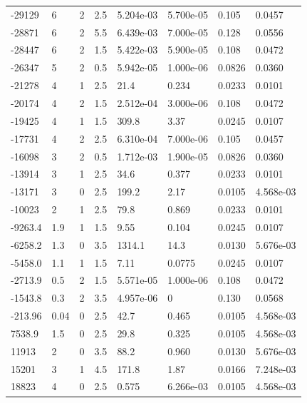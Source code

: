 \documentclass[preview]{standalone}
\begin{document}
{{\begin{tabular}{L{1.2cm}C{1.2cm} C{0.3cm}C{0.5cm} C{1.4cm}C{1.4cm} C{1.4cm}C{1.4cm}}
  -29129  &     6  & 2     & 2.5 &  5.204e-03  & 5.700e-05  & 0.105 &  0.0457   \\ 
  -28871  &     6  & 2     & 5.5 &  6.439e-03  & 7.000e-05  & 0.128 &  0.0556   \\ 
  -28447  &     6  & 2     & 1.5 &  5.422e-03  & 5.900e-05  & 0.108 &  0.0472   \\ 
  -26347  &     5  & 2     & 0.5 &  5.942e-05  & 1.000e-06  & 0.0826 &  0.0360   \\ 
  -21278  &     4  & 1     & 2.5 &  21.4  & 0.234  & 0.0233 &  0.0101   \\ 
  -20174  &     4  & 2     & 1.5 &  2.512e-04  & 3.000e-06  & 0.108 &  0.0472   \\ 
  -19425  &     4  & 1     & 1.5 &  309.8  & 3.37  & 0.0245 &  0.0107   \\ 
  -17731  &     4  & 2     & 2.5 &  6.310e-04  & 7.000e-06  & 0.105 &  0.0457   \\ 
  -16098  &     3  & 2     & 0.5 &  1.712e-03  & 1.900e-05  & 0.0826 &  0.0360   \\ 
  -13914  &     3  & 1     & 2.5 &  34.6  & 0.377  & 0.0233 &  0.0101   \\ 
  -13171  &     3  & 0     & 2.5 &  199.2  & 2.17  & 0.0105 &  4.568e-03   \\ 
  -10023  &     2  & 1     & 2.5 &  79.8  & 0.869  & 0.0233 &  0.0101   \\ 
  -9263.4  &   1.9  & 1     & 1.5 &  9.55  & 0.104  & 0.0245 &  0.0107   \\ 
  -6258.2  &   1.3  & 0     & 3.5 &  1314.1  & 14.3  & 0.0130 &  5.676e-03   \\ 
  -5458.0  &   1.1  & 1     & 1.5 &  7.11  & 0.0775  & 0.0245 &  0.0107   \\ 
  -2713.9  &   0.5  & 2     & 1.5 &  5.571e-05  & 1.000e-06  & 0.108 &  0.0472   \\ 
  -1543.8  &   0.3  & 2     & 3.5 &  4.957e-06  & 0  & 0.130 &  0.0568   \\ 
  -213.96  &  0.04  & 0     & 2.5 &  42.7  & 0.465  & 0.0105 &  4.568e-03   \\ 
  7538.9  &   1.5  & 0     & 2.5 &  29.8  & 0.325  & 0.0105 &  4.568e-03   \\ 
  11913  &     2  & 0     & 3.5 &  88.2  & 0.960  & 0.0130 &  5.676e-03   \\ 
  15201  &     3  & 1     & 4.5 &  171.8  & 1.87  & 0.0166 &  7.248e-03   \\ 
  18823  &     4  & 0     & 2.5 &  0.575  & 6.266e-03  & 0.0105 &  4.568e-03   \\ 

\end{tabular}}}
\end{document}
